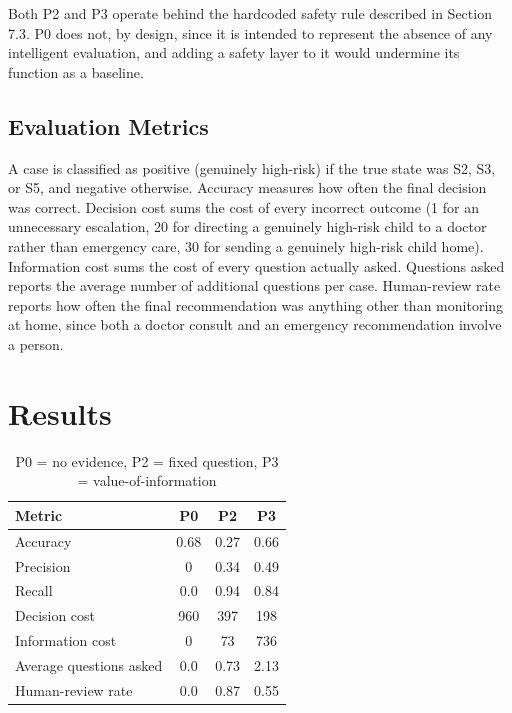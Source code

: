\documentclass{article}
\begin{document}
Both P2 and P3 operate behind the hardcoded safety rule described in
Section 7.3. P0 does not, by design, since it is intended to represent
the absence of any intelligent evaluation, and adding a safety layer to
it would undermine its function as a baseline.

\hypertarget{evaluation-metrics}{%
\subsection{Evaluation Metrics}\label{evaluation-metrics}}

A case is classified as positive (genuinely high-risk) if the true state
was S2, S3, or S5, and negative otherwise. Accuracy measures how often
the final decision was correct. Decision cost sums the cost of every
incorrect outcome (1 for an unnecessary escalation, 20 for directing a
genuinely high-risk child to a doctor rather than emergency care, 30 for
sending a genuinely high-risk child home). Information cost sums the
cost of every question actually asked. Questions asked reports the
average number of additional questions per case. Human-review rate
reports how often the final recommendation was anything other than
monitoring at home, since both a doctor consult and an emergency
recommendation involve a person.

\hypertarget{results}{%
\section{Results}\label{results}}

\begin{table}[t]
\centering\small
\begin{tabular}{@{}lccc@{}}
\toprule
\textbf{Metric} & \textbf{P0} & \textbf{P2} & \textbf{P3} \\
\midrule
Accuracy & 0.68 & 0.27 & 0.66 \\
Precision & 0 & 0.34 & 0.49 \\
Recall & 0.0 & 0.94 & 0.84 \\
Decision cost & 960 & 397 & 198 \\
Information cost & 0 & 73 & 736 \\
Average questions asked & 0.0 & 0.73 & 2.13 \\
Human-review rate & 0.0 & 0.87 & 0.55 \\
\bottomrule
\end{tabular}
\caption*{\footnotesize P0 = no evidence, P2 = fixed question, P3 = value-of-information}
\end{table}
\end{document}
